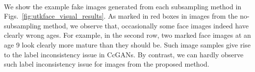 \documentclass[10pt, twocolumn]{article}
\theoremstyle{definition}
\begin{document}
\begin{figure*}[!htbp]
	\centering
	\quad
	\\
	\quad
	\quad
	\caption{Example UTKFace images for ages from 3 to 57 (from top to bottom).}
	\label{fig:utkface_visual_results}
\end{figure*}


We show the example fake images generated from each subsampling method in Figs.\ \ref{fig:utkface_visual_results}. As marked in red boxes in images from the no-subsampling method, we observe that, occasionally some face images indeed have clearly wrong ages. For example, in the second row, two marked face images at an age 9 look clearly more mature than they should be. Such image samples give rise to the label inconsistency issue in CcGANs. By contrast, we can hardly observe such label inconsistency issue for images from the proposed method. 
\end{document}
